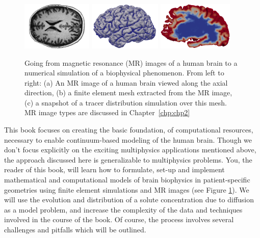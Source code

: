 \begin{figure}
  \begin{center}
  \includegraphics[height=2.3cm]{./graphics/chp1/T1-image-rot-white}
  \includegraphics[height=2.3cm]{./graphics/chp1/ernie-volume-64}
  \includegraphics[height=2.3cm]{./graphics/chp1/soltn-t30-crop}
  \hfill
  \end{center}
  \caption{Going from magnetic resonance (MR) images of a human brain
    to a numerical simulation of a biophysical phenomenon. From left
    to right: (a) An MR image of a human brain viewed along the axial
    direction, (b) a finite element mesh extracted from the MR image,
    (c) a snapshot of a tracer distribution simulation over this
    mesh. MR image types are discussed in Chapter~\ref{chp:chp2}}
  \label{fig:chp1:pipeline}
\end{figure}

This book focuses on creating the basic foundation, of computational resources, 
necessary to enable continuum-based modeling of the human brain.  Though we 
don't focus explicitly on the exciting multiphysics applications mentioned 
above, the approach discussed here is generalizable to multiphysics problems.  %
%
You, the reader of this book, will learn how to formulate, set-up and implement 
mathematical and computational models of brain biophysics in patient-specific 
geometries using finite element simulations and MR images (see Figure
\ref{fig:chp1:pipeline}). We will use the evolution and distribution
of a solute concentration due to diffusion as a model problem, and
increase the complexity of the data and techniques involved in the
course of the book. Of course, the process involves several challenges
and pitfalls which will be outlined.

